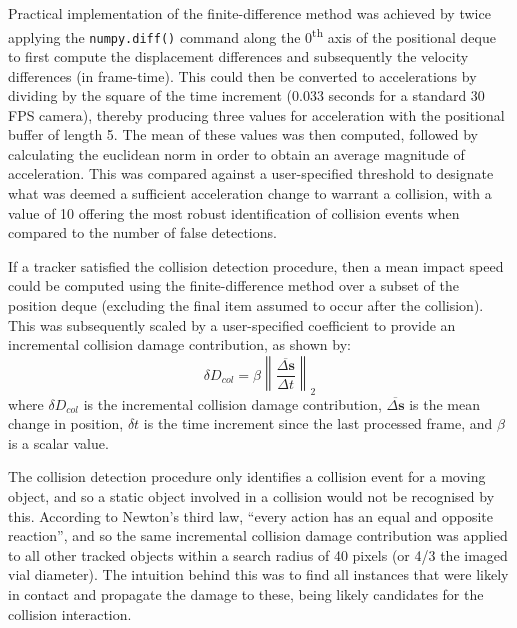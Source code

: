 \documentclass[10pt]{article}
\newcommand{\norm}[1]{\left\lVert #1 \right\rVert}
\renewcommand{\vec}[1]{\mathbf{#1}}
\newcommand*\mean[1]{\overline{#1}}
\begin{document}
Practical implementation of the finite-difference method was achieved by twice applying the \texttt{numpy.diff()} command along the 0\textsuperscript{th} axis of the positional deque to first compute the displacement differences and subsequently the velocity differences (in frame-time). This could then be converted to accelerations by dividing by the square of the time increment (0.033 seconds for a standard 30 FPS camera), thereby producing three values for acceleration with the positional buffer of length 5. The mean of these values was then computed, followed by calculating the euclidean norm in order to obtain an average magnitude of acceleration. This was compared against a user-specified threshold to designate what was deemed a sufficient acceleration change to warrant a collision, with a value of 10 offering the most robust identification of collision events when compared to the number of false detections.

If a tracker satisfied the collision detection procedure, then a mean impact speed could be computed using the finite-difference method over a subset of the position deque (excluding the final item assumed to occur after the collision). This was subsequently scaled by a user-specified coefficient to provide an incremental collision damage contribution, as shown by:
\begin{equation}
    \delta D_{col} = \beta \norm{ \frac{ \mean{ {\Delta \vec{s}} } }{ \Delta t } }_2 
    \label{eqn:collision_equation}
\end{equation}
where $\delta D_{col}$ is the incremental collision damage contribution, $\mean{ {\Delta \vec{s}} }$ is the mean change in position, $\delta t$ is the time increment since the last processed frame, and $\beta$ is a scalar value.

The collision detection procedure only identifies a collision event for a moving object, and so a static object involved in a collision would not be recognised by this. According to Newton's third law, ``every action has an equal and opposite reaction'', and so the same incremental collision damage contribution was applied to all other tracked objects within a search radius of 40 pixels (or 4/3 the imaged vial diameter). The intuition behind this was to find all instances that were likely in contact and propagate the damage to these, being likely candidates for the collision interaction.
\end{document}

